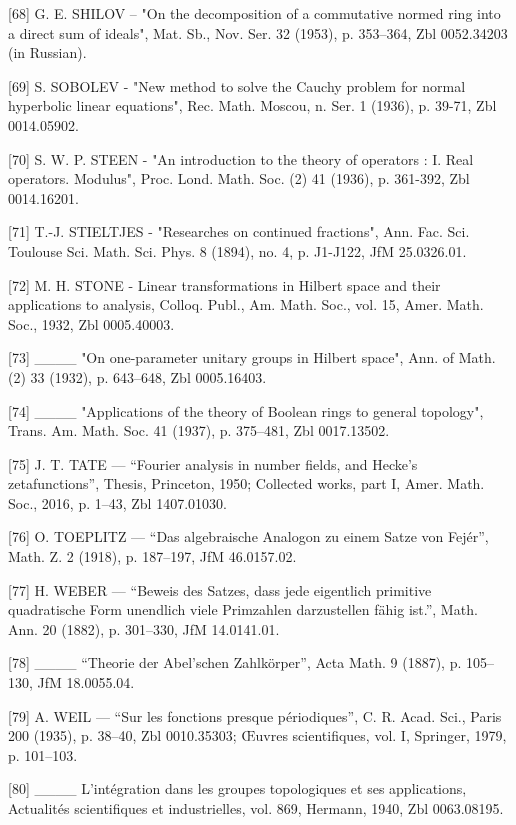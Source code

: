 {[}68{]} G. E. SHILOV -- "On the decomposition of a commutative normed ring into a direct sum of ideals", Mat. Sb., Nov. Ser. 32 (1953), p. 353--364, Zbl 0052.34203 (in Russian).

{[}69{]} S. SOBOLEV - "New method to solve the Cauchy problem for normal hyperbolic linear equations", Rec. Math. Moscou, n. Ser. 1 (1936), p. 39-71, Zbl 0014.05902.

{[}70{]} S. W. P. STEEN - "An introduction to the theory of operators : I. Real operators. Modulus", Proc. Lond. Math. Soc. (2) 41 (1936), p. 361-392, Zbl 0014.16201.

{[}71{]} T.-J. STIELTJES - "Researches on continued fractions", Ann. Fac. Sci. Toulouse Sci. Math. Sci. Phys. 8 (1894), no. 4, p. J1-J122, JfM 25.0326.01.

{[}72{]} M. H. STONE - Linear transformations in Hilbert space and their applications to analysis, Colloq. Publ., Am. Math. Soc., vol. 15, Amer. Math. Soc., 1932, Zbl 0005.40003.

{[}73{]} \_\_\_\_ "On one-parameter unitary groups in Hilbert space", Ann. of Math. (2) 33 (1932), p. 643--648, Zbl 0005.16403.

{[}74{]} \_\_\_\_ "Applications of the theory of Boolean rings to general topology", Trans. Am. Math. Soc. 41 (1937), p. 375--481, Zbl 0017.13502.

{[}75{]} J. T. TATE — “Fourier analysis in number fields, and Hecke's zetafunctions”, Thesis, Princeton, 1950; Collected works, part I, Amer. Math. Soc., 2016, p. 1–43, Zbl 1407.01030.

{[}76{]} O. TOEPLITZ — “Das algebraische Analogon zu einem Satze von Fejér”, Math. Z. 2 (1918), p. 187–197, JfM 46.0157.02.

{[}77{]} H. WEBER — “Beweis des Satzes, dass jede eigentlich primitive quadratische Form unendlich viele Primzahlen darzustellen fähig ist.”, Math. Ann. 20 (1882), p. 301–330, JfM 14.0141.01.

{[}78{]} \_\_\_\_ “Theorie der Abel'schen Zahlkörper”, Acta Math. 9 (1887), p. 105–130, JfM 18.0055.04.

{[}79{]} A. WEIL — “Sur les fonctions presque périodiques”, C. R. Acad. Sci., Paris 200 (1935), p. 38–40, Zbl 0010.35303; Œuvres scientifiques, vol. I, Springer, 1979, p. 101–103.

{[}80{]} \_\_\_\_ L'intégration dans les groupes topologiques et ses applications, Actualités scientifiques et industrielles, vol. 869, Hermann, 1940, Zbl 0063.08195.

